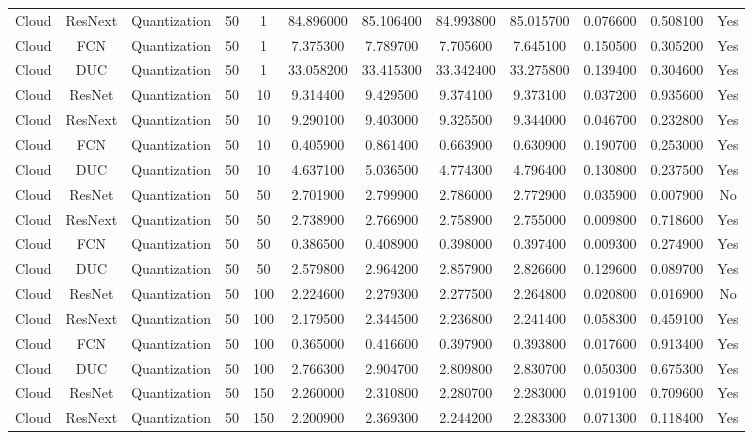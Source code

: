 \begin{tabular}{|c||c||c||c||c||c||c||c||c||c||c||c|}
Cloud & ResNext & Quantization & 50 & 1 & 84.896000 & 85.106400 & 84.993800 & 85.015700 & 0.076600 & 0.508100 & Yes \\
Cloud & FCN & Quantization & 50 & 1 & 7.375300 & 7.789700 & 7.705600 & 7.645100 & 0.150500 & 0.305200 & Yes \\
Cloud & DUC & Quantization & 50 & 1 & 33.058200 & 33.415300 & 33.342400 & 33.275800 & 0.139400 & 0.304600 & Yes \\
Cloud & ResNet & Quantization & 50 & 10 & 9.314400 & 9.429500 & 9.374100 & 9.373100 & 0.037200 & 0.935600 & Yes \\
Cloud & ResNext & Quantization & 50 & 10 & 9.290100 & 9.403000 & 9.325500 & 9.344000 & 0.046700 & 0.232800 & Yes \\
Cloud & FCN & Quantization & 50 & 10 & 0.405900 & 0.861400 & 0.663900 & 0.630900 & 0.190700 & 0.253000 & Yes \\
Cloud & DUC & Quantization & 50 & 10 & 4.637100 & 5.036500 & 4.774300 & 4.796400 & 0.130800 & 0.237500 & Yes \\
Cloud & ResNet & Quantization & 50 & 50 & 2.701900 & 2.799900 & 2.786000 & 2.772900 & 0.035900 & 0.007900 & No \\
Cloud & ResNext & Quantization & 50 & 50 & 2.738900 & 2.766900 & 2.758900 & 2.755000 & 0.009800 & 0.718600 & Yes \\
Cloud & FCN & Quantization & 50 & 50 & 0.386500 & 0.408900 & 0.398000 & 0.397400 & 0.009300 & 0.274900 & Yes \\
Cloud & DUC & Quantization & 50 & 50 & 2.579800 & 2.964200 & 2.857900 & 2.826600 & 0.129600 & 0.089700 & Yes \\
Cloud & ResNet & Quantization & 50 & 100 & 2.224600 & 2.279300 & 2.277500 & 2.264800 & 0.020800 & 0.016900 & No \\
Cloud & ResNext & Quantization & 50 & 100 & 2.179500 & 2.344500 & 2.236800 & 2.241400 & 0.058300 & 0.459100 & Yes \\
Cloud & FCN & Quantization & 50 & 100 & 0.365000 & 0.416600 & 0.397900 & 0.393800 & 0.017600 & 0.913400 & Yes \\
Cloud & DUC & Quantization & 50 & 100 & 2.766300 & 2.904700 & 2.809800 & 2.830700 & 0.050300 & 0.675300 & Yes \\
Cloud & ResNet & Quantization & 50 & 150 & 2.260000 & 2.310800 & 2.280700 & 2.283000 & 0.019100 & 0.709600 & Yes \\
Cloud & ResNext & Quantization & 50 & 150 & 2.200900 & 2.369300 & 2.244200 & 2.283300 & 0.071300 & 0.118400 & Yes \\

\end{tabular}
